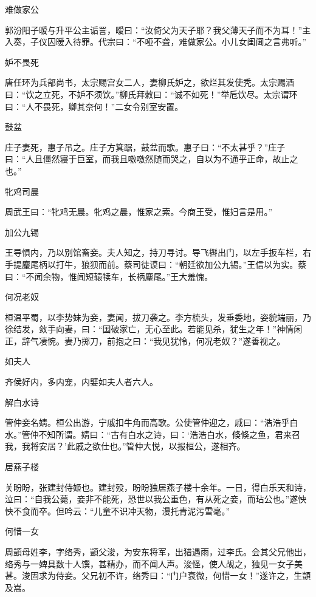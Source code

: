 \documentclass[a4paper,12pt,UTF8,twoside]{ctexbook}
\begin{document}
    难做家公
    
    郭汾阳子暧与升平公主诟詈，暧曰：“汝倚父为天子耶？我父薄天子而不为耳！”主入奏，子仪囚暧入待罪。代宗曰：“不哑不聋，难做家公。小儿女闺阃之言弗听。”
    
    妒不畏死
    
    唐任环为兵部尚书，太宗赐宫女二人，妻柳氏妒之，欲烂其发使秃。太宗赐酒曰：“饮之立死，不妒不须饮。”柳氏拜敕曰：“诚不如死！”举卮饮尽。太宗谓环曰：“人不畏死，卿其奈何！”二女令别室安置。
    
    鼓盆
    
    庄子妻死，惠子吊之。庄子方箕踞，鼓盆而歌。惠子曰：“不太甚乎？”庄子曰：“人且僵然寝于巨室，而我且噭噭然随而哭之，自以为不通乎正命，故止之也。”
    
    牝鸡司晨
    
    周武王曰：“牝鸡无晨。牝鸡之晨，惟家之索。今商王受，惟妇言是用。”
    
    加公九锡
    
    王导惧内，乃以别馆畜妾。夫人知之，持刀寻讨。导飞辔出门，以左手扳车栏，右手提麈尾柄以打牛，狼狈而前。蔡司徒谟曰：“朝廷欲加公九锡。”王信以为实。蔡曰：“不闻余物，惟闻短辕犊车，长柄麈尾。”王大羞愧。
    
    何况老奴
    
    桓温平蜀，以李势妹为妾，妻闻，拔刀袭之。李方梳头，发垂委地，姿貌端丽，乃徐结发，敛手向妻，曰：“国破家亡，无心至此。若能见杀，犹生之年！”神情闲正，辞气凄惋。妻乃掷刀，前抱之曰：“我见犹怜，何况老奴？”遂善视之。
    
    如夫人
    
    齐侯好内，多内宠，内嬖如夫人者六人。
    
    解白水诗
    
    管仲妾名婧。桓公出游，宁戚扣牛角而高歌。公使管仲迎之，戚曰：“浩浩乎白水。”管仲不知所谓。婧曰：“古有白水之诗，曰：‘浩浩白水，倏倏之鱼，君来召我，我将安居？’此戚之欲仕也。”管仲大悦，以报桓公，遂相齐。
    
    居燕子楼
    
    关盼盼，张建封侍姬也。建封殁，盼盼独居燕子楼十余年。一日，得白乐天和诗，泣曰：“自我公薨，妾非不能死，恐世以我公重色，有从死之妾，而玷公也。”遂怏怏不食而卒。但吟云：“儿童不识冲天物，漫托青泥污雪毫。”
    
    何惜一女
    
    周顗母姓李，字络秀，顗父浚，为安东将军，出猎遇雨，过李氏。会其父兄他出，络秀与一婢具数十人馔，甚精办，而不闻人声。浚怪，使人觇之，独见一女子美甚。浚固求为侍妾。父兄初不许，络秀曰：“门户衰微，何惜一女！”遂许之，生顗及嵩。
    
\end{document}
